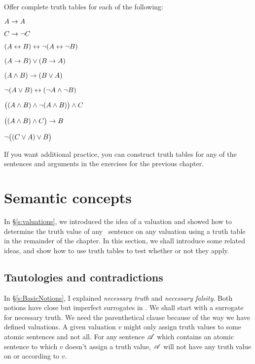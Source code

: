 

\practiceproblems\label{pr.TT.TTorC}
\problempart
Offer complete truth tables for each of the following:
\begin{earg}
\item $A \rightarrow A$ %
\item $C \rightarrow\neg C$ %
\item $(A \leftrightarrow B) \leftrightarrow \neg(A\leftrightarrow \neg B)$ %
\item $(A \rightarrow B) \vee (B \rightarrow A)$ %
\item $(A \wedge B) \rightarrow (B \vee A)$  %
\item $\neg(A \vee B) \leftrightarrow (\neg A \wedge \neg B)$ %
\item $\bigl( (A\wedge B) \wedge\neg(A\wedge B) \bigr) \wedge C$ %
\item $\bigl( (A \wedge B) \wedge C\bigr) \rightarrow B$ %
\item $\neg\bigl( (C\vee A) \vee B\bigr)$ %
\end{earg}

If you want additional practice, you can construct truth tables for any of the sentences and arguments in the exercises for the previous chapter.


\chapter{Semantic concepts}
In §\ref{s:valuations}, we introduced the idea of a valuation and showed how to determine the truth value of any \TFL\ sentence on any valuation using a truth table in the remainder of the chapter. In this section, we shall introduce some related ideas, and show how to use truth tables to test whether or not they apply.


\section{Tautologies and contradictions}
In §\ref{s:BasicNotions}, I explained \emph{necessary truth} and \emph{necessary falsity}. Both notions have close but imperfect surrogates in \TFL. We shall start with a surrogate for necessary truth.
We need the parenthetical clause because of the way we have defined valuations. A given valuation $v$ might only assign truth values to some atomic sentences and not all. For any sentence $\mathscr{A}$ which contains an atomic sentence to which $v$ doesn't assign a truth value, $\mathscr{A}$ will not have any truth value on or according to $v$.

